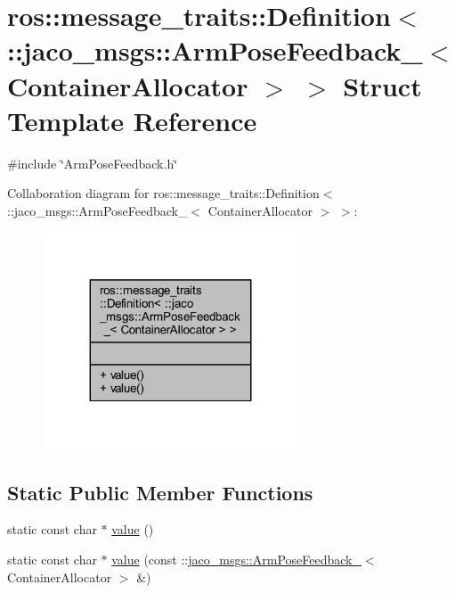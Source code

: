 \hypertarget{structros_1_1message__traits_1_1Definition_3_01_1_1jaco__msgs_1_1ArmPoseFeedback___3_01ContainerAllocator_01_4_01_4}{}\section{ros\+:\+:message\+\_\+traits\+:\+:Definition$<$ \+:\+:jaco\+\_\+msgs\+:\+:Arm\+Pose\+Feedback\+\_\+$<$ Container\+Allocator $>$ $>$ Struct Template Reference}
\label{structros_1_1message__traits_1_1Definition_3_01_1_1jaco__msgs_1_1ArmPoseFeedback___3_01ContainerAllocator_01_4_01_4}


{\ttfamily \#include \char`\"{}Arm\+Pose\+Feedback.\+h\char`\"{}}



Collaboration diagram for ros\+:\+:message\+\_\+traits\+:\+:Definition$<$ \+:\+:jaco\+\_\+msgs\+:\+:Arm\+Pose\+Feedback\+\_\+$<$ Container\+Allocator $>$ $>$\+:
\nopagebreak
\begin{figure}[H]
\begin{center}
\leavevmode
\includegraphics[width=215pt]{dd/d9f/structros_1_1message__traits_1_1Definition_3_01_1_1jaco__msgs_1_1ArmPoseFeedback___3_01Containerd75f8250d968640fa4dc064421cb083a}
\end{center}
\end{figure}
\subsection*{Static Public Member Functions}
\begin{DoxyCompactItemize}
\item 
static const char $\ast$ \hyperlink{structros_1_1message__traits_1_1Definition_3_01_1_1jaco__msgs_1_1ArmPoseFeedback___3_01ContainerAllocator_01_4_01_4_a06b1a8847f9b4d6f1182ad1652b46e80}{value} ()
\item 
static const char $\ast$ \hyperlink{structros_1_1message__traits_1_1Definition_3_01_1_1jaco__msgs_1_1ArmPoseFeedback___3_01ContainerAllocator_01_4_01_4_a2b8026ddac9060d98f987f3c96382e1e}{value} (const \+::\hyperlink{structjaco__msgs_1_1ArmPoseFeedback__}{jaco\+\_\+msgs\+::\+Arm\+Pose\+Feedback\+\_\+}$<$ Container\+Allocator $>$ \&)
\end{DoxyCompactItemize}


